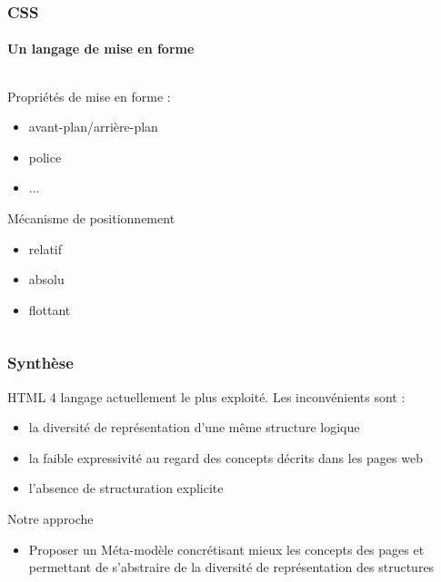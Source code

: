 \documentclass[9pt]{beamer}
\begin{document}
\begin{frame}
\frametitle{CSS}
\framesubtitle{Un langage de mise en forme}
\begin{columns}
	\begin{column}{5cm}
	\begin{block}{Propriétés de mise en forme :}		
		\begin{itemize}
			\item avant-plan/arrière-plan
			\item police
			\item ...
		\end{itemize}
	\end{block}
	\begin{block}{Mécanisme de positionnement}
		\begin{itemize}
			\item relatif
			\item absolu
			\item flottant
		\end{itemize}
	\end{block}
	\end{column}
	\begin{column}{5cm}
	\end{column}
\end{columns}\end{frame}

\begin{frame}
\frametitle{Synthèse}
\begin{block}{}
HTML 4 langage actuellement le plus exploité. Les inconvénients sont :
\begin{itemize}
	\item la diversité de représentation d'une même structure logique
	\item la faible expressivité au regard des concepts décrits dans les pages web
	\item l'absence de structuration explicite
\end{itemize}
\end{block}
\begin{block}{Notre approche}
\begin{itemize}
	\item Proposer un Méta-modèle concrétisant mieux les concepts des pages et permettant de s'abstraire de la diversité de représentation des structures 
\end{itemize}
\end{block}
\end{frame}
\end{document}
